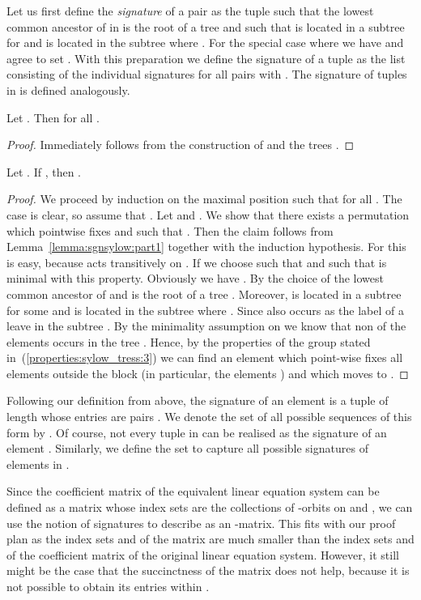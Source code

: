 \documentclass[a4paper,UKenglish]{lipics}
\theoremstyle{plain}
\begin{document}
Let us first define the \emph{signature}  of a pair  as the tuple  such that the lowest common ancestor of  in  is the 
root of a tree  and  such that  is located in a subtree 
 for  and  is located in the 
subtree  where . For the 
special case where  we have  and agree to set . With this 
preparation we define the signature  of a tuple  as the list  consisting of the individual signatures 
 for all pairs  with .
The signature of tuples in  is defined analogously.

\begin{lemma}
\label{lemma:sgnsylow:part1}
 Let . Then  for all .
\end{lemma}
\begin{proof}
 Immediately follows from the construction of  and the trees
.
\end{proof}


\begin{lemma}
Let . If , then .
\end{lemma}
\begin{proof}
 We proceed by induction on the maximal position  such that
 for all . The case  is clear, so assume
that .
Let  and . We show that there exists a permutation  which pointwise fixes  and such that
. Then the claim follows from
Lemma~\ref{lemma:sgnsylow:part1} together with the induction hypothesis.
For  this is easy, because  acts transitively on . If  we choose  such that
 and such that  is minimal with this 
property.
Obviously we
have . By the choice of  the lowest common ancestor of
 and  is the root of a tree . Moreover,  is
located in a subtree  for some  and
 is located in the subtree  where . Since  also  occurs as the label of a
leave in the subtree .
By the minimality assumption on  we know that non of the elements 
 occurs in the tree .
Hence, by the
properties of the group  stated in~(\ref{properties:sylow_tress:3})
we can find an element  which point-wise fixes all elements
outside the block  (in particular, the elements ) and which moves  to . 
\end{proof}


Following our definition from above, the signature  of an element 
 is a tuple of length  whose entries are pairs 
. We denote the set of all possible 
sequences of this form by . Of course, not every tuple in  can be
realised as the signature  of an element . 
Similarly, we define the set  to capture all possible signatures of elements in .

\medskip
Since the coefficient matrix  of the equivalent linear 
equation system  can be defined 
as a matrix whose index sets are the collections of -orbits on 
 and , we can use the notion of signatures to describe 
 as an 
-matrix. This fits with our 
proof plan as the index sets  and  of the 
matrix  are much smaller than the  index sets  and  of the 
coefficient matrix  of the original linear equation system.
However, it still might be the case that the succinctness of the 
matrix  does not help, because it is not possible to obtain its 
entries within .
\end{document}

